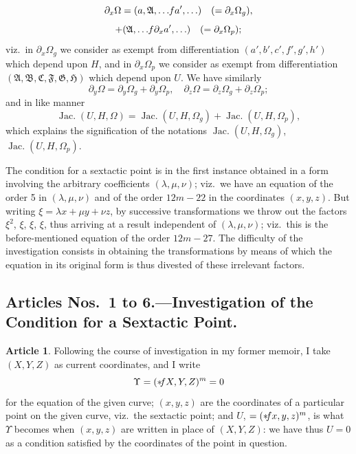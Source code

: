 \documentclass[12pt,a4paper]{article}
\theoremstyle{definition}
\newtheorem{art}{Article}[section]
\DeclareMathOperator{\Jac}{Jac.}
\begin{document}
\[
\partial_x \Omega = (a, \mathfrak{A}, \ldots \hspace{-2pt} fa', \ldots) \quad (= \partial_x \Omega_g),
\]
\[
+ (\mathfrak{A}, \ldots \hspace{-2pt} f\partial_x a', \ldots) \quad (= \partial_x \Omega_p);
\]
viz.\ in $\partial_x \Omega_g$ we consider as exempt from differentiation $(a', b', c', f', g', h')$ which depend upon $H$, and in $\partial_x \Omega_p$ we consider as exempt from differentiation $(\mathfrak{A}, \mathfrak{B}, \mathfrak{C}, \mathfrak{F}, \mathfrak{G}, \mathfrak{H})$ which depend upon $U$. We have similarly
\[
\partial_y \Omega = \partial_y \Omega_g + \partial_y \Omega_p, \quad \partial_z \Omega = \partial_z \Omega_g + \partial_z \Omega_p;
\]
and in like manner
\[
\Jac(U, H, \Omega) = \Jac(U, H, \Omega_g) + \Jac(U, H, \Omega_p),
\]
which explains the signification of the notations $\Jac(U, H, \Omega_g)$, $\Jac(U, H, \Omega_p)$.

The condition for a sextactic point is in the first instance obtained in a form involving the arbitrary coefficients $(\lambda, \mu, \nu)$; viz.\ we have an equation of the order 5 in $(\lambda, \mu, \nu)$ and of the order $12m - 22$ in the coordinates $(x, y, z)$. But writing $\xi = \lambda x + \mu y + \nu z$, by successive transformations we throw out the factors $\xi^2$, $\xi$, $\xi$, $\xi$, thus arriving at a result independent of $(\lambda, \mu, \nu)$; viz.\ this is the before-mentioned equation of the order $12m - 27$. The difficulty of the investigation consists in obtaining the transformations by means of which the equation in its original form is thus divested of these irrelevant factors.

\subsection*{Articles Nos.\ 1 to 6.---Investigation of the Condition for a Sextactic Point.}

\begin{art}
Following the course of investigation in my former memoir, I take $(X, Y, Z)$ as current coordinates, and I write
\[
\Upsilon = (* \hspace{-2pt} fX, Y, Z)^m = 0
\]
for the equation of the given curve; $(x, y, z)$ are the coordinates of a particular point on the given curve, viz.\ the sextactic point; and $U$, $= (* \hspace{-2pt} fx, y, z)^m$, is what $\Upsilon$ becomes when $(x, y, z)$ are written in place of $(X, Y, Z)$: we have thus $U = 0$ as a condition satisfied by the coordinates of the point in question.
\end{art}
\end{document}
